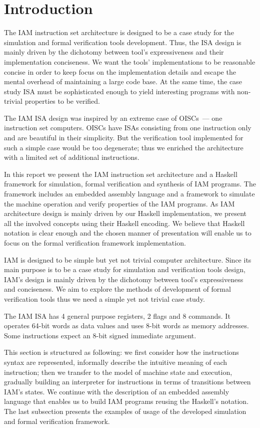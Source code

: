 \section{Introduction}

The IAM instruction set architecture is designed to be a case study for
the simulation and formal verification tools development. Thus, the ISA design
is mainly driven by the dichotomy between tool's expressiveness and their
implementation conciseness.
We want the tools' implementations to be reasonable concise in order to keep
focus on the
implementation details and escape the mental overhead of maintaining a large
code base. At the same time, the case study ISA must be sophisticated enough to
yield interesting programs with non-trivial properties to be verified.

The IAM ISA design was inspired by an extreme case of OISCs~--- one instruction
set computers. OISCs have ISAs consisting from one instruction only and are
beautiful in their simplicity. But the verification tool implemented for such a
simple case would be too degenerate; thus we enriched the architecture with a
limited set of additional instructions.

In this report we present the IAM instruction set architecture and a Haskell
framework for simulation, formal verification and synthesis of IAM programs.
The framework includes an embedded assembly language and a framework to
simulate the machine operation and verify properties of the IAM programs. As
IAM architecture design is mainly driven by our Haskell implementation, we
present all the involved concepts using their Haskell encoding. We believe that
Haskell notation is clear enough and the chosen manner of presentation will
enable us to focus on the formal verification framework implementation.

IAM is designed to be simple but yet not trivial computer architecture. Since
its main purpose is to be a case study for simulation and verification tools
design, IAM's design is mainly driven by the dichotomy between tool's
expressiveness and conciseness. We aim to explore the methods of development of
formal verification tools thus we need a simple yet not trivial case study.

The IAM ISA has 4 general purpose registers, 2 flags and 8 commands. It
operates 64-bit words as data values and uses 8-bit words as memory addresses.
Some instructions expect an 8-bit signed immediate argument.

This section is structured as following: we first consider how the instructions
syntax are represented, informally describe the intuitive meaning of each
instruction; then we transfer to the model of machine state and execution,
gradually building an interpreter for instructions in terms of transitions
between IAM's states. We continue with the description of an embedded assembly
language that enables us to build IAM programs reusing the Haskell's notation.
The last subsection presents the examples of usage of the developed simulation
and formal verification framework.